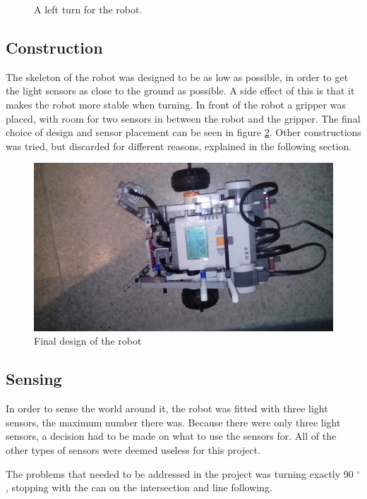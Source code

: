 \begin{figure}

 \caption{A left turn for the robot.}
 \label{fig:left_turn}
\end{figure}

\subsection{Construction}
The skeleton of the robot was designed to be as low as possible, in order to get the light sensors as close to the ground as possible. A side effect of this is that it makes the robot more stable when turning. In front of the robot a gripper was placed, with room for two sensors in between the robot and the gripper. The final choice of design and sensor placement can be seen in figure \ref{fig:final_robot}. Other constructions was tried, but discarded for different reasons, explained in the following section.

\begin{figure}[H]
\centering
 \includegraphics[scale = 0.1]{img/robot.jpg}
 \caption{Final design of the robot}
 \label{fig:final_robot}
\end{figure}

\subsection{Sensing}
In order to sense the world around it, the robot was fitted with three light sensors, the maximum number there was. Because there were only three light sensors, a decision had to be made on what to use the sensors for. All of the other types of sensors were deemed useless for this project.

The problems that needed to be addressed in the project was turning exactly 90 $^{\circ}$, stopping with the can on the intersection and line following.

